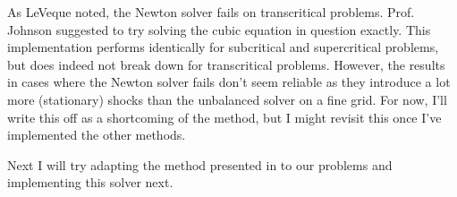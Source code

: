 \documentclass[a4paper,onecolumn,11pt]{report}
\begin{document}
As LeVeque noted, the Newton solver fails on transcritical problems. Prof. Johnson suggested to try solving the cubic equation in question exactly. This implementation performs identically for subcritical and supercritical problems, but does indeed not break down for transcritical problems. However, the results in cases where the Newton solver fails don't seem reliable as they introduce a lot more (stationary) shocks than the unbalanced solver on a fine grid. For now, I'll write this off as a shortcoming of the method, but I might revisit this once I've implemented the other methods.

Next I will try adapting the method presented in \citet{rogers2003mathematical} to our problems and implementing this solver next.



\end{document}
